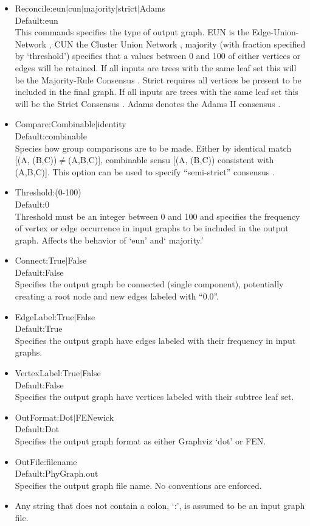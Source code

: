 \documentclass[11pt]{memoir}
\begin{document}
	
	\begin{itemize}
		\item {Reconcile:eun$\mid$cun$\mid$majority$\mid$strict$\mid$Adams\\Default:eun\\This commands specifies the type of output graph.
		EUN is the Edge-Union-Network \cite{MiyagiandWheeler2019}, CUN the Cluster Union Network \citep{Baroni2005},
		majority (with fraction specified by `threshold') specifies that a values between 0 and 100 of either vertices or edges will be retained.  If all inputs are trees with the same leaf set this will be the Majority-Rule Consensus \citep{MargushandMcMorris1981}.
		Strict requires all vertices be present to be included in the final graph.  If all inputs are trees with the same leaf set this will be the Strict Consensus \citep{Schuhandpolhemus1980}. Adams denotes the Adams II consensus \citep{Adams1972}.}
		\item{Compare:Combinable$\mid$identity\\Default:combinable\\Species how group comparisons are to be made.  Either by identical match [(A, (B,C))$\neq$(A,B,C)],
			combinable sensu \cite{Nelson1979} [(A, (B,C)) consistent with (A,B,C)].  This option can be used to specify ``semi-strict'' consensus
			\citep{Bremer1990}.
		}
		\item{Threshold:(0-100)\\Default:0\\Threshold must be an integer between 0 and 100 and specifies the frequency of vertex or edge occurrence in input graphs to be included in the output graph.  Affects the behavior of `eun' and` majority.'
		}
		\item{Connect:True$\mid$False\\Default:False\\Specifies the output graph be connected (single component), potentially creating a root node and new edges labeled with ``0.0''.
		}
		\item{EdgeLabel:True$\mid$False\\Default:True\\Specifies the output graph have edges labeled with their frequency in input graphs.
		}
		\item{VertexLabel:True$\mid$False\\Default:False\\Specifies the output graph have vertices labeled with their subtree leaf set.
		}
		\item{OutFormat:Dot$\mid$FENewick\\Default:Dot\\Specifies the output graph format as either Graphviz `dot' or FEN.
		}
		\item{OutFile:filename\\Default:PhyGraph.out\\Specifies the output graph file name. No conventions are enforced.
		}
		\item{Any string that does not contain a colon, `:', is assumed to be an input graph file. 
		}
	\end{itemize}
	
\end{document}
